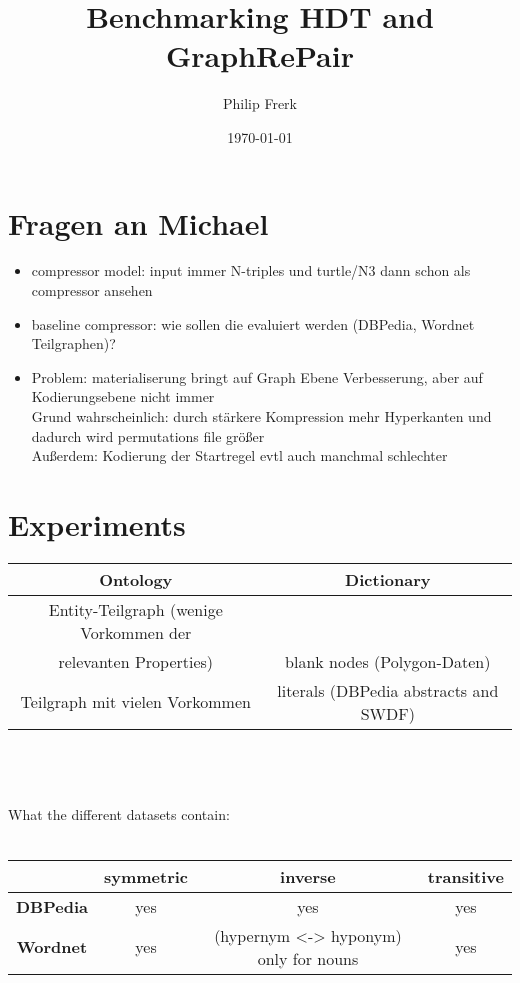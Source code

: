 \documentclass[a4paper]{scrartcl}
\title{Benchmarking HDT and GraphRePair}
\author{Philip Frerk}
\date{\today}
\begin{document}
\maketitle


\section{Fragen an Michael}

\begin{itemize}
	\item compressor model: input immer N-triples und turtle/N3 dann schon als compressor ansehen
	\item baseline compressor: wie sollen die evaluiert werden (DBPedia, Wordnet Teilgraphen)?
	\item Problem: materialiserung bringt auf Graph Ebene Verbesserung, aber auf Kodierungsebene nicht immer\\
			Grund wahrscheinlich: durch stärkere Kompression mehr Hyperkanten und dadurch wird permutations file größer\\
			Außerdem: Kodierung der Startregel evtl auch manchmal schlechter
\end{itemize}

\section{Experiments}

\begin{tabular}{|c|c|}
	\hline 
	\textbf{Ontology} & \textbf{Dictionary} \\ 
	\hline 
	Entity-Teilgraph (wenige Vorkommen der \\relevanten Properties) & blank nodes (Polygon-Daten) \\ 
	\hline 
	Teilgraph mit vielen Vorkommen & literals (DBPedia abstracts and SWDF) \\ 
	\hline 
\end{tabular} 
\\\\\\What the different datasets contain:\\\\
\begin{tabular}{|c|c|c|c|}
	\hline 
	& \textbf{symmetric} & \textbf{inverse} & \textbf{transitive} \\ 
	\hline 
	\textbf{DBPedia} & yes & yes & yes \\ 
	\hline 
	\textbf{Wordnet} & yes & (hypernym <-> hyponym) only for nouns & yes \\ 
	\hline 
\end{tabular} 
\end{document}
